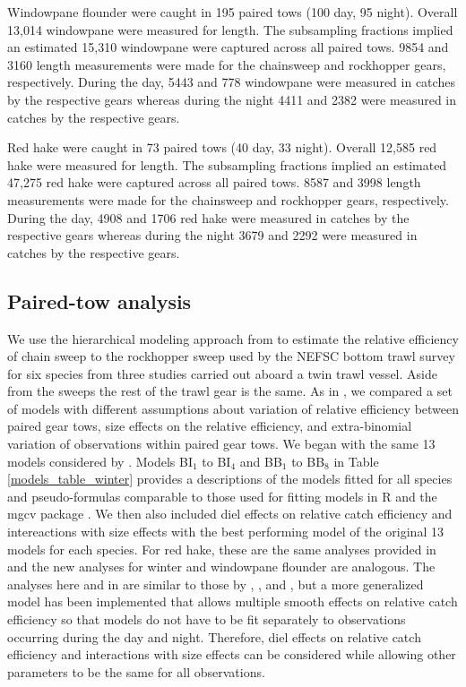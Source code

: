 \documentclass[]{article}
\begin{document}
Windowpane flounder were caught in 195 paired tows (100 day, 95 night).
Overall 13,014 windowpane were measured for length. The subsampling
fractions implied an estimated 15,310 windowpane were captured across
all paired tows. 9854 and 3160 length measurements were made for the
chainsweep and rockhopper gears, respectively. During the day, 5443 and
778 windowpane were measured in catches by the respective gears whereas
during the night 4411 and 2382 were measured in catches by the
respective gears.

Red hake were caught in 73 paired tows (40 day, 33 night). Overall
12,585 red hake were measured for length. The subsampling fractions
implied an estimated 47,275 red hake were captured across all paired
tows. 8587 and 3998 length measurements were made for the chainsweep and
rockhopper gears, respectively. During the day, 4908 and 1706 red hake
were measured in catches by the respective gears whereas during the
night 3679 and 2292 were measured in catches by the respective gears.

\hypertarget{paired-tow-analysis}{%
\subsection{Paired-tow analysis}\label{paired-tow-analysis}}

We use the hierarchical modeling approach from \citet{miller13} to
estimate the relative efficiency of chain sweep to the rockhopper sweep
used by the NEFSC bottom trawl survey for six species from three studies
carried out aboard a twin trawl vessel. Aside from the sweeps the rest
of the trawl gear is the same. As in \citet{miller13}, we compared a set
of models with different assumptions about variation of relative
efficiency between paired gear tows, size effects on the relative
efficiency, and extra-binomial variation of observations within paired
gear tows. We began with the same 13 models considered by
\citet{miller13}. Models BI\(_1\) to BI\(_4\) and BB\(_1\) to BB\(_8\)
in Table \ref{models_table_winter} provides a descriptions of the models
fitted for all species and pseudo-formulas comparable to those used for
fitting models in R and the mgcv package \citep{R19, wood06}. We then
also included diel effects on relative catch efficiency and
intereactions with size effects with the best performing model of the
original 13 models for each species. For red hake, these are the same
analyses provided in \citet{milleretal20} and the new analyses for
winter and windowpane flounder are analogous. The analyses here and in
\citet{milleretal20} are similar to those by \citet{milleretal17a},
\citet{milleretal17b}, and \citet{milleretal18}, but a more generalized
model has been implemented that allows multiple smooth effects on
relative catch efficiency so that models do not have to be fit
separately to observations occurring during the day and night.
Therefore, diel effects on relative catch efficiency and interactions
with size effects can be considered while allowing other parameters to
be the same for all observations.
\end{document}
